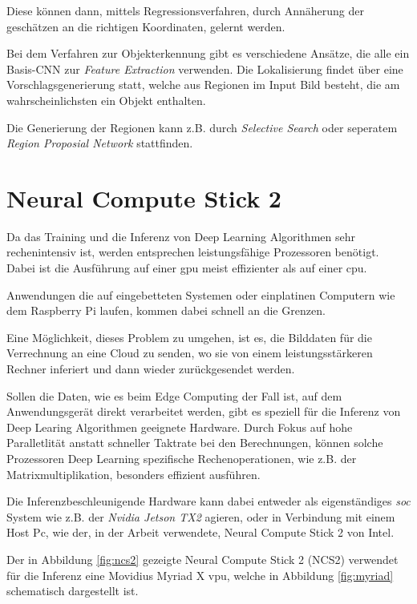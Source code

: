 Diese können dann, mittels Regressionsverfahren, 
durch Annäherung der geschätzen an die richtigen 
Koordinaten, gelernt werden.

Bei dem Verfahren zur Objekterkennung gibt es 
verschiedene Ansätze, die alle ein Basis-CNN
zur \textit{Feature Extraction} verwenden.
Die Lokalisierung findet über eine 
Vorschlagsgenerierung statt, welche aus 
Regionen im Input Bild besteht, die 
am wahrscheinlichsten ein Objekt enthalten.

Die Generierung der Regionen kann z.B. durch
\textit{Selective Search} oder
seperatem \textit{Region Proposial Network}
stattfinden.



\section{Neural Compute Stick 2}\label{ncs2}

Da das Training und die Inferenz von Deep Learning Algorithmen
sehr rechenintensiv ist, werden entsprechen leistungsfähige 
Prozessoren benötigt. Dabei ist die Ausführung auf einer
\Gls{gpu} meist effizienter als auf einer \Gls{cpu}.


Anwendungen die auf eingebetteten Systemen oder einplatinen 
Computern wie dem Raspberry Pi laufen, kommen dabei schnell
an die Grenzen.

Eine Möglichkeit, dieses Problem zu umgehen,
ist es, die Bilddaten für die 
Verrechnung an eine Cloud zu senden, wo sie 
von einem leistungsstärkeren Rechner inferiert und 
dann wieder zurückgesendet werden.

Sollen die Daten, wie es beim Edge Computing der Fall ist, 
auf dem Anwendungsgerät direkt verarbeitet werden,
gibt es speziell für die Inferenz von Deep Learing Algorithmen
geeignete Hardware.
Durch Fokus auf hohe Paralletlität anstatt schneller Taktrate
bei den Berechnungen, können solche Prozessoren
Deep Learning spezifische Rechenoperationen, 
wie z.B. der Matrixmultiplikation, besonders effizient 
ausführen.

Die Inferenzbeschleunigende Hardware kann dabei entweder
als eigenständiges \textit{\Gls{soc}}
System wie z.B. der \textit{Nvidia Jetson TX2} agieren, oder
in Verbindung mit einem Host Pc, wie der, in der Arbeit 
verwendete, Neural Compute Stick 2 von Intel.

Der in Abbildung \ref{fig:ncs2} gezeigte Neural Compute 
Stick 2 (NCS2) verwendet für die Inferenz eine
Movidius Myriad X \Gls{vpu},
welche in Abbildung \ref{fig:myriad} schematisch 
dargestellt ist.


